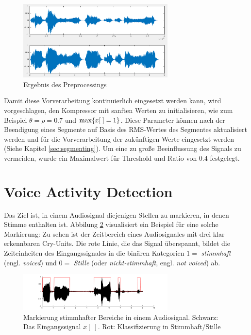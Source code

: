 \begin{figure}[h]
	\centering
	\includegraphics[width=0.7\textwidth]{bilder/compressing01.png}
	\caption{Ergebnis des Preprocessings}
	\label{img:compressing01}
\end{figure}

Damit diese Vorverarbeitung kontinuierlich eingesetzt werden kann, wird vorgeschlagen, den Kompressor mit \grqq sanften Werten\grqq{} zu initialisieren, wie zum Beispiel $\theta = \rho = 0.7$ und $\operatorname*{max}\{x[\;] = 1\}$. Diese Parameter können nach der Beendigung eines Segmente auf Basis des RMS-Wertes des Segmentes aktualisiert werden und für die Vorverarbeitung der zukünftigen Werte eingesetzt werden (Siehe Kapitel \ref{sec:segmenting}). Um eine zu große Beeinflussung des Signals zu vermeiden, wurde ein Maximalwert für Threshold und Ratio von $0.4$ festgelegt.

\section{Voice Activity Detection}
\label{sec:vad}

Das Ziel ist, in einem Audiosignal diejenigen Stellen zu markieren, in denen Stimme enthalten ist. Abbilung \ref{img:vad01} visualisiert ein Beispiel für eine solche Markierung: Zu sehen ist der Zeitbereich eines Audiosignales mit drei klar erkennbaren Cry-Units. Die rote Linie, die das Signal überspannt, bildet die Zeiteinheiten des Eingangssignales in die binären Kategorien $1 =$ \emph{stimmhaft} (engl. \emph{voiced}) und $0 = $ \emph{Stille} (oder \emph{nicht-stimmhaft}, engl. \emph{not voiced}) ab.

\begin{figure}[h]
	\centering
	\includegraphics[width=0.7\textwidth]{bilder/vad_introduction01.png}
	\caption{Markierung stimmhafter Bereiche in einem Audiosignal. Schwarz: Das Eingangssignal $x[\;]$. Rot: Klassifizierung in Stimmhaft/Stille}
	\label{img:vad01}
\end{figure}

